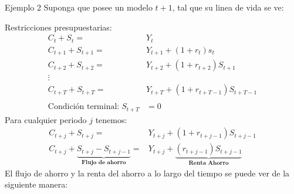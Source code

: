 \documentclass[12pt]{article}
\begin{document}
\begin{ejemplo}{Ejemplo 2}
    Suponga que posee un modelo $t+1$, tal que su linea de vida se ve: 
    \begin{figure} [H]
        \centering 
        
        \label{fig:placeholder}
    \end{figure}
    Restricciones presupuestarias:
    \begin{align*}
        C_t+S_t=&Y_t\\
        C_{t+1}+S_{t+1}=&Y_{t+1}+(1+r_t)s_t\\ 
        C_{t+2}+S_{t+2}=&Y_{t+2}+(1+r_{t+2})S_{t+1}\\
        \vdots \\ 
        C_{t+T}+S_{t+T}=&Y_{t+T}+(1+r_{t+T-1})S_{t+T-1}\\\\
        \text{Condición terminal:}\; S_{t+T}&=0
    \end{align*}
    Para cualquier periodo $j$ tenemos: 
    \begin{align*}
        C_{t+j}+S_{t+j} =& Y_{t+j}+(1+r_{t+j-1})S_{t+j-1}\\
        C_{t+j}+\underbrace{S_{t+j}-S_{t+j-1}}_{\textbf{Flujo de ahorro}} =&Y_{t+j}+\underbrace{(r_{t+j-1})S_{t+j-1}}_{\textbf{Renta Ahorro}}
    \end{align*}
    El flujo de ahorro y la renta del ahorro a lo largo del tiempo se puede ver de la siguiente manera:
    \begin{figure} [H]
        \centering 
        
        \label{fig:placeholder}
    \end{figure}
    \end{ejemplo}
    \newpage
\end{document}
